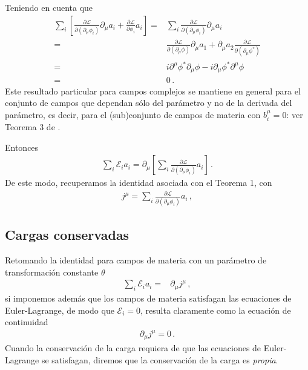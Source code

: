 \begin{frame}
Teniendo en cuenta que 
\begin{align}
  \label{eq:identityth2}
  \sum_i \left[\frac{\partial\mathcal{L}}{\partial(\partial_{\mu}\phi_i)}\partial_{\mu}a_i+\frac{\partial\mathcal{L}}{\partial\phi_i}a_i \right]=&
 \sum_i \frac{\partial\mathcal{L}}{\partial(\partial_{\mu}\phi_i)}\partial_{\mu}a_i \nonumber\\
 =& \frac{\partial\mathcal{L}}{\partial(\partial_{\mu}\phi)}\partial_{\mu}a_{1} +  \partial_{\mu}a_2\frac{\partial\mathcal{L}}{\partial(\partial_{\mu}\phi^{*})} \nonumber\\
  =&i\partial^{\mu}\phi^{*} \partial_{\mu}\phi-i \partial_{\mu}\phi^{*}\partial^{\mu}\phi\nonumber\\
=&0\,.
\end{align}
Este resultado particular para campos complejos se mantiene en general para el conjunto de campos que dependan sólo del parámetro y no de la derivada del parámetro, es decir, para el (sub)conjunto de campos de materia con $b_i^\mu=0$: ver Teorema 3 de \cite{Brading:2000hc}. 


Entonces
\begin{align}
\sum_i \mathcal{E}_ia_i=  \partial_{\mu} \left[ \sum_i \frac{\partial\mathcal{L}}{\partial(\partial_{\mu}\phi_i)}a_i\right]\,.
\end{align}
De este modo, recuperamos la identidad asociada con el Teorema 1, con
\begin{align}
\label{eq:tnoeth2}
j^\mu=\sum_i\frac{\partial\mathcal{L}}{\partial(\partial_{\mu}\phi_i)}a_{i}\,,
\end{align}

\subsection{Cargas conservadas}
Retomando la identidad para campos de materia con un parámetro de transformación constante $\theta$
\begin{align}
     \sum_i \mathcal{E}_ia_{i}     
 =& \partial_{\mu} j^{\mu}\,,
\end{align}
si imponemos además que los campos de materia satisfagan las ecuaciones de Euler-Lagrange, de modo que $\mathcal{E}_i=0$, resulta claramente como la ecuación de continuidad
\begin{align}
  \partial_{\mu} j^{\mu}=0\,.
\end{align}
Cuando la conservación de la carga requiera de que las ecuaciones de Euler-Lagrange se satisfagan, diremos que la conservación de la carga es \emph{propia}.
\end{frame}


